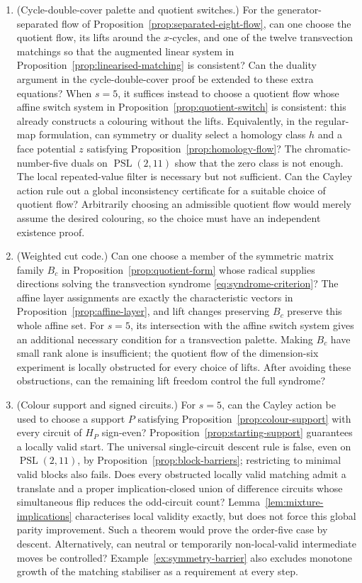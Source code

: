 \documentclass[11pt,a4paper]{article}
\theoremstyle{definition}
\theoremstyle{remark}
\newcommand{\PSL}{\operatorname{PSL}}
\begin{document}
\begin{enumerate}[leftmargin=2em]
\item (Cycle-double-cover palette and quotient switches.)  For the generator-separated flow of Proposition~\ref{prop:separated-eight-flow}, can one choose the quotient flow, its lifts around the $x$-cycles, and one of the twelve transvection matchings so that the augmented linear system in Proposition~\ref{prop:linearised-matching} is consistent?  Can the duality argument in the cycle-double-cover proof be extended to these extra equations?  When $s=5$, it suffices instead to choose a quotient flow whose affine switch system in Proposition~\ref{prop:quotient-switch} is consistent: this already constructs a colouring without the lifts.  Equivalently, in the regular-map formulation, can symmetry or duality select a homology class $h$ and a face potential $z$ satisfying Proposition~\ref{prop:homology-flow}?  The chromatic-number-five duals on $\PSL(2,11)$ show that the zero class is not enough.  The local repeated-value filter is necessary but not sufficient.  Can the Cayley action rule out a global inconsistency certificate for a suitable choice of quotient flow?  Arbitrarily choosing an admissible quotient flow would merely assume the desired colouring, so the choice must have an independent existence proof.
\item (Weighted cut code.)  Can one choose a member of the symmetric matrix family $B_c$ in Proposition~\ref{prop:quotient-form} whose radical supplies directions solving the transvection syndrome \eqref{eq:syndrome-criterion}?  The affine layer assignments are exactly the characteristic vectors in Proposition~\ref{prop:affine-layer}, and lift changes preserving $B_c$ preserve this whole affine set.  For $s=5$, its intersection with the affine switch system gives an additional necessary condition for a transvection palette.  Making $B_c$ have small rank alone is insufficient; the quotient flow of the dimension-six experiment is locally obstructed for every choice of lifts.  After avoiding these obstructions, can the remaining lift freedom control the full syndrome?
\item (Colour support and signed circuits.)  For $s=5$, can the Cayley action be used to choose a support $P$ satisfying Proposition~\ref{prop:colour-support} with every circuit of $H_P$ sign-even?  Proposition~\ref{prop:starting-support} guarantees a locally valid start.  The universal single-circuit descent rule is false, even on $\PSL(2,11)$, by Proposition~\ref{prop:block-barriers}; restricting to minimal valid blocks also fails.  Does every obstructed locally valid matching admit a translate and a proper implication-closed union of difference circuits whose simultaneous flip reduces the odd-circuit count?  Lemma~\ref{lem:mixture-implications} characterises local validity exactly, but does not force this global parity improvement.  Such a theorem would prove the order-five case by descent.  Alternatively, can neutral or temporarily non-local-valid intermediate moves be controlled?  Example~\ref{ex:symmetry-barrier} also excludes monotone growth of the matching stabiliser as a requirement at every step.

\end{enumerate}
\end{document}
